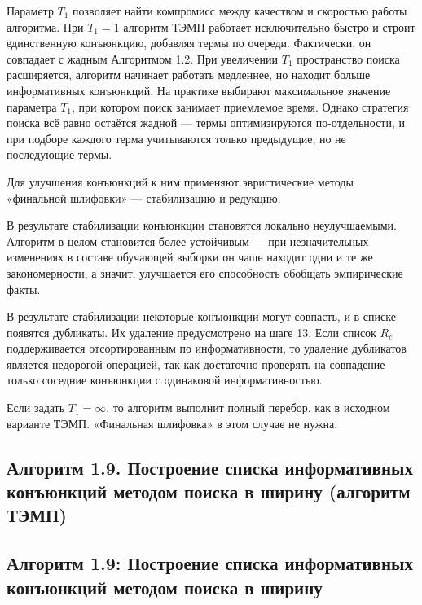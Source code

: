 \begin{itemize}
Параметр $T_1$ позволяет найти компромисс между качеством и скоростью работы алгоритма. При $T_1 = 1$ алгоритм ТЭМП работает исключительно быстро и строит единственную конъюнкцию, добавляя термы по очереди. Фактически, он совпадает с жадным Алгоритмом 1.2. При увеличении $T_1$ пространство поиска расширяется, алгоритм начинает работать медленнее, но находит больше информативных конъюнкций. На практике выбирают максимальное значение параметра $T_1$, при котором поиск занимает приемлемое время. Однако стратегия поиска всё равно остаётся жадной — термы оптимизируются по-отдельности, и при подборе каждого терма учитываются только предыдущие, но не последующие термы.

Для улучшения конъюнкций к ним применяют эвристические методы «финальной шлифовки» — стабилизацию и редукцию.

В результате стабилизации конъюнкции становятся локально неулучшаемыми. Алгоритм в целом становится более устойчивым — при незначительных изменениях в составе обучающей выборки он чаще находит одни и те же закономерности, а значит, улучшается его способность обобщать эмпирические факты.

В результате стабилизации некоторые конъюнкции могут совпасть, и в списке появятся дубликаты. Их удаление предусмотрено на шаге 13. Если список $R_c$ поддерживается отсортированным по информативности, то удаление дубликатов является недорогой операцией, так как достаточно проверять на совпадение только соседние конъюнкции с одинаковой информативностью.

Если задать $T_1 = \infty$, то алгоритм выполнит полный перебор, как в исходном варианте ТЭМП. «Финальная шлифовка» в этом случае не нужна.

\subsection{Алгоритм 1.9. Построение списка информативных конъюнкций методом поиска в ширину (алгоритм ТЭМП)}


\subsection{Алгоритм 1.9: Построение списка информативных конъюнкций методом поиска в ширину}


\end{itemize}
